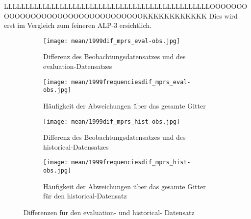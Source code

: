LLLLLLLLLLLLLLLLLLLLLLLLLLLLLLLLLLLLLLLLLLLLLLLLOOOOOOOOOOOOOOOOOOOOOOOOOOOOOOOOOKKKKKKKKKKKK Dies wird erst im Vergleich zum feineren ALP-3 ersichtlich.\hfill\\

\begin{figure}[h]
	\centering
	\begin{subfigure}[h]{0.49\textwidth}
		\centering
		\texttt{[image: mean/1999dif\_mprs\_eval-obs.jpg]}
		\caption{Differenz des Beobachtungsdatensatzes und des evaluation-Datensatzes}
		\label{fig:eval_dif}
	\end{subfigure}
	\begin{subfigure}[h]{0.49\textwidth}
		\centering
		\texttt{[image: mean/1999frequenciesdif\_mprs\_eval-obs.jpg]}
		\caption{Häufigkeit der Abweichungen über das gesamte Gitter}
		\label{fig:eval_freq_dif}
	\end{subfigure}
	\begin{subfigure}[h]{0.49\textwidth}
		\centering
		\texttt{[image: mean/1999dif\_mprs\_hist-obs.jpg]}
		\caption{Differenz des Beobachtungsdatensatzes und des historical-Datensatzes}
		\label{fig:hist_dif}
	\end{subfigure}
	\begin{subfigure}[h]{0.49\textwidth}
		\centering
		\texttt{[image: mean/1999frequenciesdif\_mprs\_hist-obs.jpg]}
		\caption{Häufigkeit der Abweichungen über das gesamte Gitter für den historical-Datensatz}
		\label{fig:hist_freq_dif}
	\end{subfigure}
	\caption{Differenzen für den evaluation- und historical- Datensatz}
\end{figure}


